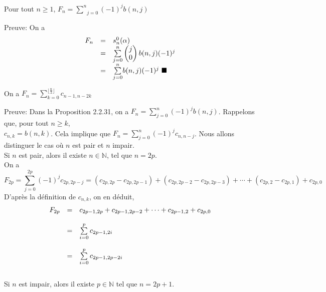 \begin{proposition}
	Pour tout $ n\geq 1$, $F_{n}=\underset{j=0}{\overset{n}{\sum}}(-1)^{j}b(n,j)$
\end{proposition}
Preuve: On a
\[
	\begin{array}{l l l}
		F_{n} & = & s_{n}^{0}(\alpha) \\&=&\underset{j=0}{\overset{n}{\sum}}\begin{pmatrix} j\\0\end{pmatrix}b(n,j)(-1)^{j}\\&=&\underset{j=0}{\overset{n}{\sum}}b(n,j)(-1)^{j}\text{ }\blacksquare
	\end{array}
\]
\begin{proposition}\label{p12}
	On a $F_{n} = \sum\limits_{k=0}^{\lfloor \frac{n}{2} \rfloor}c_{n-1, n-2k}$
\end{proposition}
Preuve: Dans la Proposition 2.2.31, on a $F_{n} = \sum\limits_{j=0}^{n}(-1)^{j}b(n, j)$. Rappelons que, pour tout $n\geq k$,\\$c_{n, k} = b(n, k)$. Cela implique que $F_{n}=\sum\limits_{j=0}^{n}(-1)^{j}c_{n, n-j}$. Nous allons distinguer le cas où $n$ est pair et $n$ impair.\vspace{5pt}\\
	Si $n$ est pair, alors il existe $n \in \mathbb{N}$, tel que $n=2p$. \\
	On a
	\[
		F_{2p}=\sum\limits_{j=0}^{2p}(-1)^{j}c_{2p, 2p-j}=(c_{2p, 2p} - c_{2p, 2p-1}) + (c_{2p, 2p-2} - c_{2p, 2p-3})+ \cdots + (c_{2p, 2} - c_{2p, 1}) + c_{2p, 0}
	\]
	D'après la définition de $c_{n, k}$, on en déduit,
	\[
		\begin{array}{l l l}
			F_{2p} & =        & c_{2p-1, 2p} + c_{2p-1, 2p-2} + \cdots + c_{2p-1, 2} + c_{2p, 0} \\
			       & \text{ } &                                                                  \\
			       & =        & \sum\limits_{i=0}^{p}c_{2p-1,2i}                                 \\
			       & \text{ } &                                                                  \\
			       & =        & \sum\limits_{i=0}^{p}c_{2p-1, 2p-2i}
		\end{array}
	\]
	\text{ }\vspace{5pt}\\
	Si $n$ est impair, alors il existe $p\in \mathbb{N}$ tel que $n=2p+1$.\\
